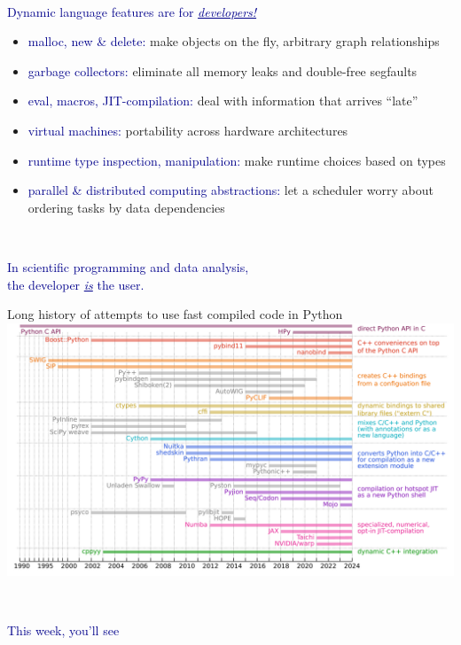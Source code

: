 \documentclass[aspectratio=169]{beamer}
\begin{document}
\begin{frame}{\mbox{ }}
\LARGE
\begin{center}
\textcolor{darkblue}{Dynamic language features are for \underline{\it developers!}}
\end{center}

\vspace{0.3 cm}
\large
\begin{itemize}\setlength{\itemsep}{0.2 cm}
\item<2-> \textcolor{darkblue}{malloc, new \& delete:} make objects on the fly, arbitrary graph relationships
\item<3-> \textcolor{darkblue}{garbage collectors:} eliminate all memory leaks and double-free segfaults
\item<4-> \textcolor{darkblue}{eval, macros, JIT-compilation:} deal with information that arrives ``late''
\item<5-> \textcolor{darkblue}{virtual machines:} portability across hardware architectures
\item<6-> \textcolor{darkblue}{runtime type inspection, manipulation:} make runtime choices based on types
\item<7-> \textcolor{darkblue}{parallel \& distributed computing abstractions:} let a scheduler worry about ordering tasks by data dependencies
\end{itemize}
\end{frame}

\begin{frame}{\mbox{ }}
\LARGE
\begin{center}
\textcolor{darkblue}{In scientific programming and data analysis, \\ the developer \underline{\it is} the user.}

\vspace{1 cm}

\end{center}
\end{frame}

\begin{frame}{Long history of attempts to use fast compiled code in Python}
\vspace{0.25 cm}
\includegraphics[width=\linewidth]{img/history-of-bindings-2.pdf}
\end{frame}

\begin{frame}{\mbox{ }}
\LARGE
\begin{center}
\textcolor{darkblue}{This week, you'll see }
\end{center}
\end{frame}
\end{document}
